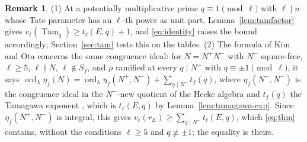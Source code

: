 \documentclass[11pt]{amsart}
\theoremstyle{definition}
\newtheorem{remark}[theorem]{Remark}
\newcommand{\ord}{\operatorname{ord}}
\newcommand{\Tam}{\operatorname{Tam}}
\begin{document}
\begin{remark}\label{rem:ko}
(1) At a potentially multiplicative prime $q\equiv1\pmod\ell$ with $\ell\mid n$ whose Tate parameter has an $\ell$-th power as unit part, Lemma~\ref{lem:tamfactor} gives $v_\ell(\Tam_q)\ge t_\ell(E,q)+1$, and \eqref{eq:identity} raises the bound accordingly; Section~\ref{sec:tam} tests this on the tables. (2) The formula of Kim and Ota \cite[Theorem 1.3]{KimOta} concerns the same congruence ideal: for $N=N^+N^-$ with $N^-$ square-free, $\ell\ge5$, $\ell\nmid N$, $\ell\notin S_f$, and $\bar\rho$ ramified at every $q\mid N^-$ with $q\equiv\pm1\pmod\ell$, it says $\ord_\lambda\eta_f(N)=\ord_\lambda\eta_f(N^+,N^-)+\sum_{q\mid N^-}t_f(q)$, where $\eta_f(N^+,N^-)$ is the congruence ideal in the $N^-$-new quotient of the Hecke algebra and $t_f(q)$ the Tamagawa exponent \cite[Definition 1.15]{KimOta}, which is $t_\ell(E,q)$ by Lemma~\ref{lem:tamagawa-exp}. Since $\eta_f(N^+,N^-)$ is integral, this gives $v_\ell(r_E)\ge\sum_{q\mid N^-}t_\ell(E,q)$, which \eqref{eq:thm} contains, without the conditions $\ell\ge5$ and $q\not\equiv\pm1$; the equality is theirs.
\end{remark}
\end{document}
